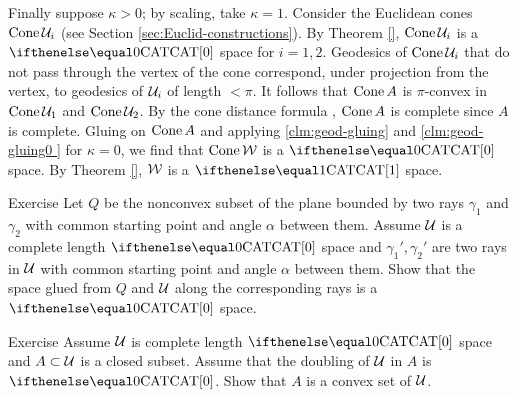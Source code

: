 Finally suppose $\kappa>0$; by  scaling, take $\kappa=1$. Consider the Euclidean cones $\mathop{\rm Cone}\nolimits\mathcal{U}_i$ (see Section \ref{sec:Euclid-constructions}).
By Theorem \ref{}, $\mathop{\rm Cone}\nolimits\mathcal{U}_i$ is a $\CAT0$ space for $i=1,2$. Geodesics of $\mathop{\rm Cone}\nolimits\mathcal{U}_i$ that do not pass through the vertex of the cone correspond, under projection from the vertex, to geodesics of $\mathcal{U}_i$ of length $<\pi$. 
  It follows that $\mathop{\rm Cone}\nolimits A$ is $\pi$-convex in $\mathop{\rm Cone}\nolimits\mathcal{U}_1$ and $\mathop{\rm Cone}\nolimits\mathcal{U}_2$. By the cone distance formula  , $\mathop{\rm Cone}\nolimits A$ is complete since $A$ is complete.
    Gluing on $\mathop{\rm Cone}\nolimits A$ and applying \ref{clm:geod-gluing} and \ref{clm:geod-gluing0 } for $\kappa=0$, we find that 
$\mathop{\rm Cone}\nolimits\mathcal{W}$ is a $\CAT0$ space.  By Theorem \ref{}, $\mathcal{W}$ is a $\CAT1$ space.
\qeds
%
%

\begin{thm}{Exercise}\label{ex:two-rays}
Let $Q$ be the nonconvex subset of the plane 
bounded by two rays $\gamma_1$ and $\gamma_2$
with common starting point and angle $\alpha$ between them.
Assume $\mathcal{U}$ is a complete length $\CAT0$ space
and $\gamma_1',\gamma_2'$ are two rays in $\mathcal{U}$ with common
starting point and angle $\alpha$ between them.
Show that the space glued from $Q$ and $\mathcal{U}$ along the corresponding rays is a $\CAT{0}$ space.
\end{thm}

\begin{thm}{Exercise}\label{ex:reshetnyak-doubling}
Assume $\mathcal{U}$ is complete length $\CAT0$ space and $A\subset \spc{U}$ is a closed subset.
Assume that the doubling of $\mathcal{U}$ in $A$ is $\CAT0$. 
Show that $A$ is a convex set of $\mathcal{U}$.
\end{thm}


